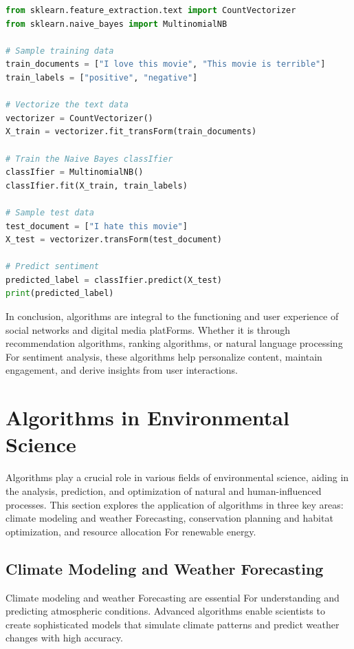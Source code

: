 \documentclass[12pt]{book} %
\begin{document}
\begin{lstlisting}[language=Python, caption=Python Example For Naive Bayes Sentiment Analysis]
from sklearn.feature_extraction.text import CountVectorizer
from sklearn.naive_bayes import MultinomialNB

# Sample training data
train_documents = ["I love this movie", "This movie is terrible"]
train_labels = ["positive", "negative"]

# Vectorize the text data
vectorizer = CountVectorizer()
X_train = vectorizer.fit_transForm(train_documents)

# Train the Naive Bayes classIfier
classIfier = MultinomialNB()
classIfier.fit(X_train, train_labels)

# Sample test data
test_document = ["I hate this movie"]
X_test = vectorizer.transForm(test_document)

# Predict sentiment
predicted_label = classIfier.predict(X_test)
print(predicted_label)
\end{lstlisting}

\FloatBarrier

In conclusion, algorithms are integral to the functioning and user experience of social networks and digital media platForms. Whether it is through recommendation algorithms, ranking algorithms, or natural language processing For sentiment analysis, these algorithms help personalize content, maintain engagement, and derive insights from user interactions.


\section{Algorithms in Environmental Science}
Algorithms play a crucial role in various fields of environmental science, aiding in the analysis, prediction, and optimization of natural and human-influenced processes. This section explores the application of algorithms in three key areas: climate modeling and weather Forecasting, conservation planning and habitat optimization, and resource allocation For renewable energy.

\subsection{Climate Modeling and Weather Forecasting}
Climate modeling and weather Forecasting are essential For understanding and predicting atmospheric conditions. Advanced algorithms enable scientists to create sophisticated models that simulate climate patterns and predict weather changes with high accuracy.
\end{document}
